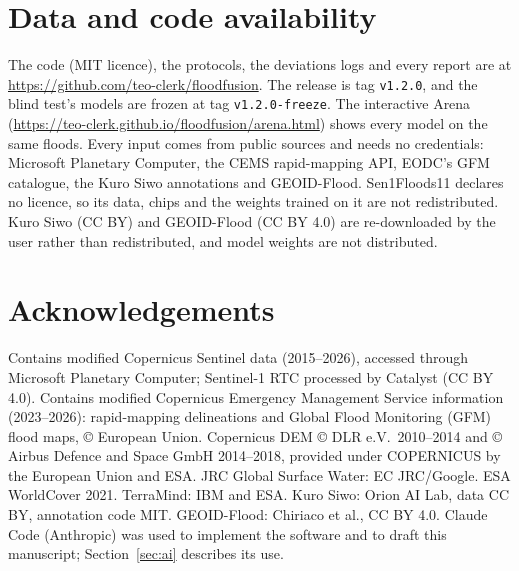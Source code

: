 \documentclass[10pt,twocolumn,a4paper]{article}
\begin{document}
\section*{Data and code availability}
The code (MIT licence), the protocols, the deviations logs and every report are at
\url{https://github.com/teo-clerk/floodfusion}. The release is tag \texttt{v1.2.0}, and the blind test's models are
frozen at tag \texttt{v1.2.0-freeze}. The interactive Arena (\url{https://teo-clerk.github.io/floodfusion/arena.html})
shows every model on the same floods. Every input comes from public sources and needs no credentials: Microsoft
Planetary Computer, the CEMS rapid-mapping API, EODC's GFM catalogue, the Kuro Siwo annotations and GEOID-Flood.
Sen1Floods11 declares no licence, so its data, chips and the weights trained on it are not redistributed. Kuro Siwo
(CC BY) and GEOID-Flood (CC BY 4.0) are re-downloaded by the user rather than redistributed, and model weights are
not distributed.

\section*{Acknowledgements}
Contains modified Copernicus Sentinel data (2015--2026), accessed through Microsoft Planetary Computer; Sentinel-1 RTC
processed by Catalyst (CC BY 4.0). Contains modified Copernicus Emergency Management Service information (2023--2026): rapid-mapping delineations and Global Flood Monitoring (GFM)
flood maps, \copyright{} European Union. Copernicus DEM \copyright{} DLR e.V.\ 2010--2014 and \copyright{} Airbus
Defence and Space GmbH 2014--2018, provided under COPERNICUS by the European Union and ESA. JRC Global Surface Water:
EC JRC/Google. ESA WorldCover 2021. TerraMind: IBM and ESA. Kuro Siwo: Orion AI Lab, data CC BY, annotation code
MIT. GEOID-Flood: Chiriaco et al., CC BY 4.0. Claude Code (Anthropic) was used to implement the software and to draft
this manuscript; Section~\ref{sec:ai} describes its use.

{\small


}
\end{document}
